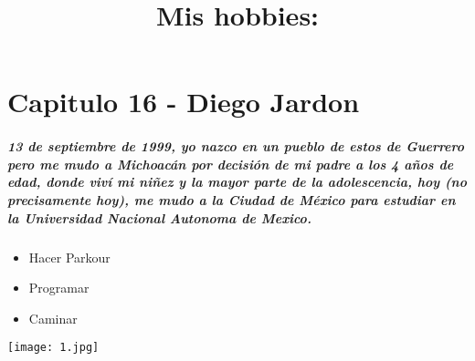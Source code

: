 \chapter{Capitulo 16 - Diego Jardon}
\paragraph{
  13 de septiembre de 1999, yo nazco en un pueblo de estos de Guerrero pero me mudo a Michoacán por decisión de mi padre a los 4 años de edad, donde viví mi niñez y la mayor parte de la adolescencia, hoy (no precisamente hoy), me mudo a la Ciudad de México para estudiar en la Universidad Nacional Autonoma de Mexico.
}

\title{Mis hobbies: }

\begin{itemize}
    \item{Hacer Parkour}
    \item{Programar}
    \item{Caminar}
\end{itemize}

\texttt{[image: 1.jpg]}